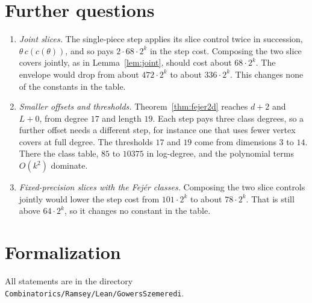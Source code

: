 \documentclass[11pt]{article}
\theoremstyle{definition}
\theoremstyle{remark}
\newcommand{\lean}[1]{\texttt{#1}}
\begin{document}
\section{Further questions}

\begin{enumerate}
\item \emph{Joint slices.} The single-piece step applies its slice control
  twice in succession, $\theta\,c(c(\theta))$, and so pays $2\cdot68\cdot2^k$
  in the step cost. Composing the two slice covers jointly, as in
  Lemma~\ref{lem:joint}, should cost about $68\cdot2^k$. The envelope would
  drop from about $472\cdot2^k$ to about $336\cdot2^k$. This changes none of
  the constants in the table.
\item \emph{Smaller offsets and thresholds.} Theorem~\ref{thm:fejer2d}
  reaches $d+2$ and $L+0$, from degree $17$ and length $19$. Each step pays
  three class degrees, so a further offset needs a different step, for
  instance one that uses fewer vertex covers at full degree. The thresholds
  $17$ and $19$ come from dimensions $3$ to $14$. There the class table,
  $85$ to $10375$ in log-degree, and the polynomial terms $O(k^2)$ dominate.
\item \emph{Fixed-precision slices with the Fej\'er classes.} Composing the
  two slice controls jointly would lower the step cost from $101\cdot2^k$ to
  about $78\cdot2^k$. That is still above $64\cdot2^k$, so it changes no
  constant in the table.
\end{enumerate}

\section{Formalization}\label{sec:lean}

All statements are in the directory
\lean{Combinatorics/Ramsey/Lean/GowersSzemeredi}.
\end{document}
